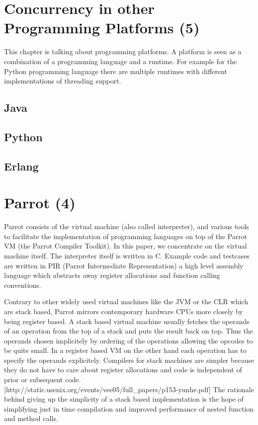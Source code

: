 \documentclass[bachelor,english]{hgbthesis}
\begin{document}
\chapter{Concurrency in other Programming Platforms (5)}

This chapter is talking about programming platforms. A platform is seen as a combination of a programming language and a runtime. For example for the Python programming language there are multiple runtimes with different implementations of threading support.

\section{Java}
\section{Python}
\section{Erlang}

\chapter{Parrot (4)}

Parrot consists of the virtual machine (also called interpreter), and various tools to facilitate the implementation of programming languages on top of the Parrot VM (the Parrot Compiler Toolkit). In this paper, we concentrate on the virtual machine itself. The interpreter itself is written in C. Example code and testcases are written in PIR (Parrot Intermediate Representation) a high level assembly language which abstracts away register allocations and function calling conventions.

Contrary to other widely used virtual machines like the JVM or the CLR which are stack based, Parrot mirrors contemporary hardware CPUs more closely by being register based. A stack based virtual machine usually fetches the operands of an operation from the top of a stack and puts the result back on top. Thus the operands chosen implicitely by ordering of the operations allowing the opcodes to be quite small. In a register based VM on the other hand each operation has to specify the operands explicitely. Compilers for stack machines are simpler because they do not have to care about register allocations and code is independent of prior or subsequent code. [http://static.usenix.org/events/vee05/full\_papers/p153-yunhe.pdf] The rationale behind giving up the simplicity of a stack based implementation is the hope of simplifying just in time compilation and improved performance of nested function and method calls.
\end{document}
